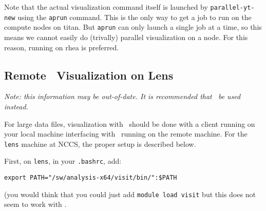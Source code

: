 Note that the actual visualization command itself is launched by
{\tt parallel-yt-new} using the {\tt aprun} command.  This is the
only way to get a job to run on the compute nodes on titan.  But
{\tt aprun} can only launch a single job at a time, so this means
we cannot easily do (trivally) parallel visualization on a node.  For
this reason, running on rhea is preferred.


\subsection{Remote \visit\ Visualization on Lens}

{\em Note: this information may be out-of-date.  It is recommended that
 \yt\ be used instead.}

For large data files, visualization with \visit\ should be done with
a client running on your local machine interfacing with \visit\ running
on the remote machine.  For the {\tt lens} machine at NCCS, the proper setup
is described below.

First, on {\tt lens}, in your {\tt .bashrc}, add:
\begin{verbatim}
export PATH="/sw/analysis-x64/visit/bin/":$PATH
\end{verbatim}
(you would think that you could just add {\tt module load visit} but this
does not seem to work with \visit.

